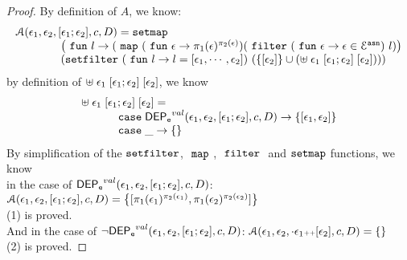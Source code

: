 \begin{proof}
By definition of $A$, we know:
%
\[
	\begin{array}{l}
	\mathcal{A}(\event_1, \event_2, [\event_1; \event_2], c, D)
	= 
	\kw{setmap} ~
	\\ \qquad \qquad
	\left(\efun l \to ( \emap 
		(\efun  \event \to \pi_1(\event)^{\pi_2(\event)})
	(\efilter 
		(\efun \event \to  \event \in \eventset^{\asn}) ~ l) \right)
	\\ \qquad \qquad
	(\kw{setfilter} ~
		(\efun l \to l = [\event_1, \cdots, \event_2]) ~ 
		\left(\left\{[\event_2]\right\} \cup \left(  {\uplus} \eapp \event_1 \eapp {[\event_1; \event_2]} \eapp [\event_2] \right) \right))
	\end{array}
\]
by definition of $ {\uplus} \; \mathtt{\epsilon}_1 \; {[\mathtt{\epsilon}_1; \mathtt{\epsilon}_2]} \; [\mathtt{\epsilon}_2]  $, we know 
\[
	\begin{array}{l}
	{\uplus} \eapp \event_1 \eapp {[\event_1; \event_2]} \eapp [\event_2] 
	=   
	\\ \quad \qquad 	
	\ecase \eventdep^{val}(\event_1, \event_2, [\event_1; \event_2], c, D)
	\to \left\{ [\event_1, \event_2] \right\}
	\\ \quad \qquad 	
	\ecase \_
	\to \left\{ \right\}
\end{array}
\]
%
By simplification of the $\mathtt{setfilter}$, $~\mathtt{map}~$, $~\mathtt{filter}~$ and $\mathtt{setmap}$ functions, we know
\\
in the case of $\mathsf{DEP_{\mathtt{e}}}^{val}(\mathtt{\epsilon}_1, \mathtt{\epsilon}_2, [\mathtt{\epsilon}_1; \mathtt{\epsilon}_2], c, D)$:
$\mathcal{A}(\event_1, \event_2, [\event_1; \event_2], c, D) = 
  \left\{[\pi_1(\event_1)^{\pi_2(\event_1)}, \pi_1(\event_2)^{\pi_2(\event_2)}] \right \}$
\\
(1) is proved.
\\
And in the case of $\neg \mathsf{DEP_{\mathtt{e}}}^{val}(\mathtt{\epsilon}_1, \mathtt{\epsilon}_2, [\mathtt{\epsilon}_1; \mathtt{\epsilon}_2], c, D)$: 
$\mathcal{A}(\event_1, \event_2, \cdot  \event_1 \tracecat [\event_2], c, D) = 
  \left\{ \right \}$
\\
(2) is proved.
\end{proof}
%
%
